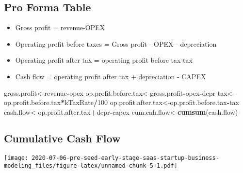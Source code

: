 \documentclass[
]{article}
\newenvironment{Shaded}{\begin{snugshade}}{\end{snugshade}}
\newcommand{\DataTypeTok}[1]{\textcolor[rgb]{0.13,0.29,0.53}{#1}}
\newcommand{\DecValTok}[1]{\textcolor[rgb]{0.00,0.00,0.81}{#1}}
\newcommand{\KeywordTok}[1]{\textcolor[rgb]{0.13,0.29,0.53}{\textbf{#1}}}
\newcommand{\NormalTok}[1]{#1}
\newcommand{\OperatorTok}[1]{\textcolor[rgb]{0.81,0.36,0.00}{\textbf{#1}}}
\newcommand{\StringTok}[1]{\textcolor[rgb]{0.31,0.60,0.02}{#1}}
\providecommand{\tightlist}{%
  \setlength{\itemsep}{0pt}\setlength{\parskip}{0pt}}
\begin{document}
\hypertarget{pro-forma-table}{%
\subsection{Pro Forma Table}\label{pro-forma-table}}

\begin{itemize}
\tightlist
\item
  Gross profit = revenue-OPEX
\item
  Operating profit before taxes = Gross profit - OPEX - depreciation
\item
  Operating profit after tax = operating profit before tax-tax
\item
  Cash flow = operating profit after tax + depreciation - CAPEX
\end{itemize}

\begin{Shaded}
\begin{Highlighting}[]
\NormalTok{gross.profit<-revenue}\OperatorTok{-}\NormalTok{opex}
\NormalTok{op.profit.before.tax<-gross.profit}\OperatorTok{-}\NormalTok{opex}\OperatorTok{-}\NormalTok{depr}
\NormalTok{tax<-op.profit.before.tax}\OperatorTok{*}\NormalTok{kTaxRate}\OperatorTok{/}\DecValTok{100}
\NormalTok{op.profit.after.tax<-op.profit.before.tax}\OperatorTok{-}\NormalTok{tax}
\NormalTok{cash.flow<-op.profit.after.tax}\OperatorTok{+}\NormalTok{depr}\OperatorTok{-}\NormalTok{capex}
\NormalTok{cum.cah.flow<-}\KeywordTok{cumsum}\NormalTok{(cash.flow)}
\end{Highlighting}
\end{Shaded}

\hypertarget{cumulative-cash-flow}{%
\subsection{Cumulative Cash Flow}\label{cumulative-cash-flow}}

\begin{Shaded}
\end{Shaded}

\texttt{[image: 2020-07-06-pre-seed-early-stage-saas-startup-business-modeling\_files/figure-latex/unnamed-chunk-5-1.pdf]}
\end{document}
